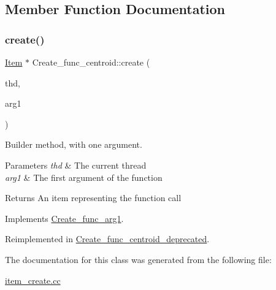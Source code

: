 \subsection{Member Function Documentation}
\mbox{\label{classCreate__func__centroid_aef4565161680a1ea2f730eb9a7a5ab3b}} 
\subsubsection{\texorpdfstring{create()}{create()}}
{\footnotesize\ttfamily \mbox{\hyperlink{classItem}{Item}} $\ast$ Create\+\_\+func\+\_\+centroid\+::create (\begin{DoxyParamCaption}\item[{T\+HD $\ast$}]{thd,  }\item[{\mbox{\hyperlink{classItem}{Item}} $\ast$}]{arg1 }\end{DoxyParamCaption})\hspace{0.3cm}{\ttfamily [virtual]}}

Builder method, with one argument. 
\begin{DoxyParams}{Parameters}
{\em thd} & The current thread \\
\hline
{\em arg1} & The first argument of the function \\
\hline
\end{DoxyParams}
\begin{DoxyReturn}{Returns}
An item representing the function call 
\end{DoxyReturn}


Implements \mbox{\hyperlink{classCreate__func__arg1_a3e9a98f755cd82c3e762e334c955a8c9}{Create\+\_\+func\+\_\+arg1}}.



Reimplemented in \mbox{\hyperlink{classCreate__func__centroid__deprecated_aceb672ea4e46c9730c4714c804333d5b}{Create\+\_\+func\+\_\+centroid\+\_\+deprecated}}.



The documentation for this class was generated from the following file\+:\begin{DoxyCompactItemize}
\item 
\mbox{\hyperlink{item__create_8cc}{item\+\_\+create.\+cc}}\end{DoxyCompactItemize}
